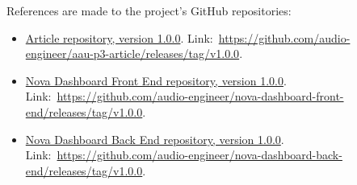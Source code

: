References are made to the project's GitHub repositories:

\begin{itemize}
    \item \href{https://github.com/audio-engineer/aau-p3-article/releases/tag/v1.0.0}
    {Article repository, version 1.0.0}.
    Link:~\url{https://github.com/audio-engineer/aau-p3-article/releases/tag/v1.0.0}.
    \item \href{https://github.com/audio-engineer/nova-dashboard-front-end/releases/tag/v1.0.0}
    {Nova Dashboard Front End repository, version 1.0.0}.
    Link:~\url{https://github.com/audio-engineer/nova-dashboard-front-end/releases/tag/v1.0.0}.
    \item \href{https://github.com/audio-engineer/nova-dashboard-back-end/releases/tag/v1.0.0}
    {Nova Dashboard Back End repository, version 1.0.0}.
    Link:~\url{https://github.com/audio-engineer/nova-dashboard-back-end/releases/tag/v1.0.0}.
\end{itemize}
